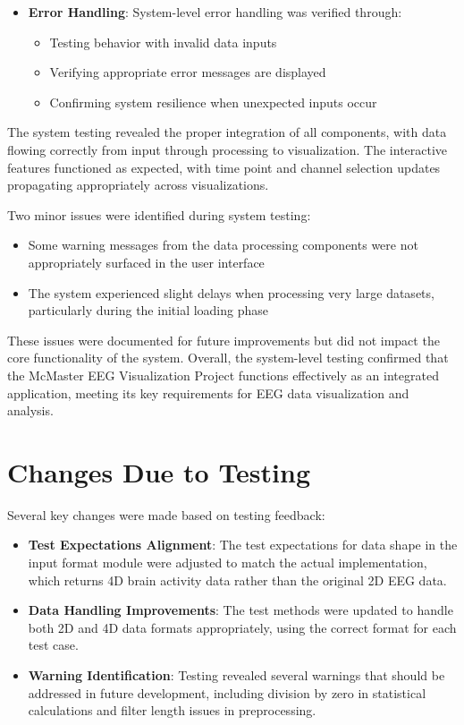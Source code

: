 \documentclass[12pt, titlepage]{article}
\begin{document}
\begin{itemize}
    \item \textbf{Error Handling}: System-level error handling was verified through:
    \begin{itemize}
        \item Testing behavior with invalid data inputs
        \item Verifying appropriate error messages are displayed
        \item Confirming system resilience when unexpected inputs occur
    \end{itemize}
\end{itemize}

The system testing revealed the proper integration of all components, with data flowing correctly from input through processing to visualization. The interactive features functioned as expected, with time point and channel selection updates propagating appropriately across visualizations.

Two minor issues were identified during system testing:
\begin{itemize}
    \item Some warning messages from the data processing components were not appropriately surfaced in the user interface
    \item The system experienced slight delays when processing very large datasets, particularly during the initial loading phase
\end{itemize}

These issues were documented for future improvements but did not impact the core functionality of the system. Overall, the system-level testing confirmed that the McMaster EEG Visualization Project functions effectively as an integrated application, meeting its key requirements for EEG data visualization and analysis.

\section{Changes Due to Testing}

Several key changes were made based on testing feedback:

\begin{itemize}
    \item \textbf{Test Expectations Alignment}: The test expectations for data shape in the input format module were adjusted to match the actual implementation, which returns 4D brain activity data rather than the original 2D EEG data.
    
    \item \textbf{Data Handling Improvements}: The test methods were updated to handle both 2D and 4D data formats appropriately, using the correct format for each test case.
    
    \item \textbf{Warning Identification}: Testing revealed several warnings that should be addressed in future development, including division by zero in statistical calculations and filter length issues in preprocessing.
\end{itemize}
\end{document}
